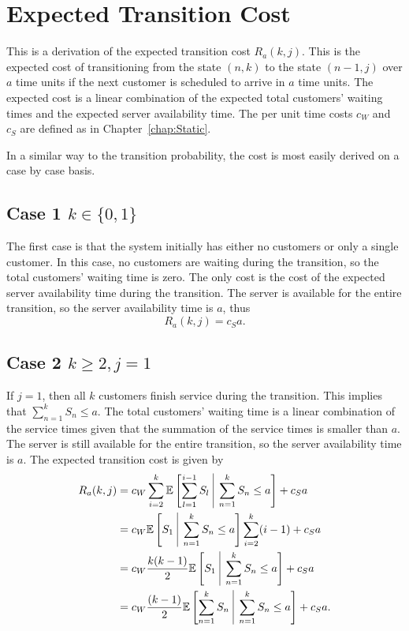 \section{Expected Transition Cost}
This is a derivation of the expected transition cost $R_{a} (k, j)$. This is the expected cost of transitioning from the state $(n, k)$ to the state $(n - 1, j)$ over $a$ time units if the next customer is scheduled to arrive in $a$ time units. The expected cost is a linear combination of the expected total customers' waiting times and the expected server availability time. The per unit time costs $c_{W}$ and $c_{S}$ are defined as in Chapter~\ref{chap:Static}.

In a similar way to the transition probability, the cost is most easily derived on a case by case basis.

\subsection{Case 1 $k \in \{ 0, 1 \}$}
The first case is that the system initially has either no customers or only a single customer. In this case, no customers are waiting during the transition, so the total customers' waiting time is zero. The only cost is the cost of the expected server availability time during the transition. The server is available for the entire transition, so the server availability time is $a$, thus
\begin{equation}
	R_{a} (k, j) = c_{S} a.
\end{equation}

\subsection{Case 2 $k \geq 2, j = 1$}
If $j = 1$, then all $k$ customers finish service during the transition. This implies that $\displaystyle \sum_{n = 1}^{k} S_{n} \leq a$. The total customers' waiting time is a linear combination of the service times given that the summation of the service times is smaller than $a$. The server is still available for the entire transition, so the server availability time is $a$. The expected transition cost is given by
\begin{equation}
	\begin{split}
		R_{a} (k, j) & = c_{W} \sum_{i = 2}^{k} \mathbb{E} \left[ \sum_{l = 1}^{i - 1} S_{l} \ \vline \ \sum_{n = 1}^{k} S_{n} \leq a \right] + c_{S} a \\
		& = c_{W} \mathbb{E} \left[ S_{1} \ \vline \ \sum_{n = 1}^{k} S_{n} \leq a \right] \sum_{i = 2}^{k} (i - 1) + c_{S} a \\
		& = c_{W} \frac{k (k - 1)}{2} \mathbb{E} \left[ S_{1} \ \vline \ \sum_{n = 1}^{k} S_{n} \leq a \right] + c_{S} a \\
		& = c_{W} \frac{(k - 1)}{2} \mathbb{E} \left[ \sum_{n = 1}^{k} S_{n} \ \vline \ \sum_{n = 1}^{k} S_{n} \leq a \right] + c_{S} a.
	\end{split}
\end{equation}


